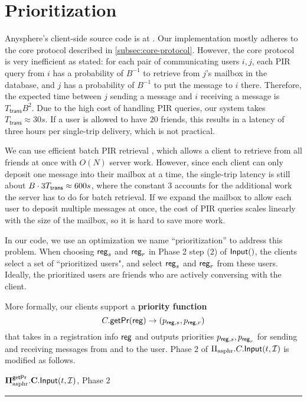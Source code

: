 \section{Prioritization}
\label{sec:actual-asphr-protocol}
Anysphere's client-side source code is at \cite{LZA2022implementation}. Our implementation mostly adheres to the core protocol described in \cref{subsec:core-protocol}. However, the core protocol is very inefficient as stated: for each pair of communicating users $i, j$, each PIR query from $i$ has a probability of $B^{-1}$ to retrieve from $j$'s mailbox in the database, and $j$ has a probability of $B^{-1}$ to put the message to $i$ there. Therefore, the expected time between $j$ sending a message and $i$ receiving a message is $T_{\mathsf{trans}} B^2$. Due to the high cost of handling PIR queries, our system takes $T_{\mathsf{trans}} \approx 30s$. If a user is allowed to have $20$ friends, this results in a latency of three hours per single-trip delivery, which is not practical.

We can use efficient batch PIR retrieval \cite{BIM2000multiretrival, YERA2004batchcode, angel2016unobservable, liutromer2021}, which allows a client to retrieve from all friends at once with $O(N)$ server work. However, since each client can only deposit one message into their mailbox at a time, the single-trip latency is still about $B \cdot 3T_{\mathsf{trans}} \approx 600s$, where the constant $3$ accounts for the additional work the server has to do for batch retrieval. If we expand the mailbox to allow each user to deposit multiple messages at once, the cost of PIR queries scales linearly with the size of the mailbox, so it is hard to save more work.

In our code, we use an optimization we name ``prioritization'' to address this problem. When choosing $\mathsf{reg}_s$ and $\mathsf{reg}_r$ in Phase 2 step (2) of $\mathsf{Input}()$, the clients select a set of ``prioritized users", and select $\mathsf{reg}_s$ and $\mathsf{reg}_r$ from these users. Ideally, the prioritized users are friends who are actively conversing with the client.

More formally, our clients support a \textbf{priority function}
$$C.\mathsf{getPr}(\mathsf{reg}) \to (p_{\mathsf{reg}, s}, p_{\mathsf{reg}, r})$$
that takes in a registration info $\mathsf{reg}$ and outputs priorities $p_{\mathsf{reg}, s}, p_{\mathsf{reg}_r}$ for sending and receiving messages from and to the user. Phase 2 of $\Pi_{\text{asphr}}.C.\mathsf{Input}(t, \mathcal{I})$ is modified as follows.

\vspace{10pt}
$\mathbf{\Pi^{\mathsf{getPr}}_{\text{asphr}}.C.\mathsf{Input}}(t, \mathcal{I})$, Phase 2
\vspace{5pt}
\hrule

